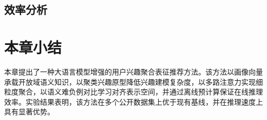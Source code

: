 \subsection{效率分析}
\label{subsec:llm-efficiency}


\section{本章小结}
\label{sec:llm-summary}

本章提出了一种大语言模型增强的用户兴趣聚合表征推荐方法。该方法以画像向量承载开放域语义知识，以聚类兴趣原型降低兴趣建模复杂度，以多路注意力实现细粒度聚合，以语义难负例对比学习对齐表示空间，并通过离线预计算保证在线推理效率。实验结果表明，该方法在多个公开数据集上优于现有基线，并在推理速度上具有显著优势。

